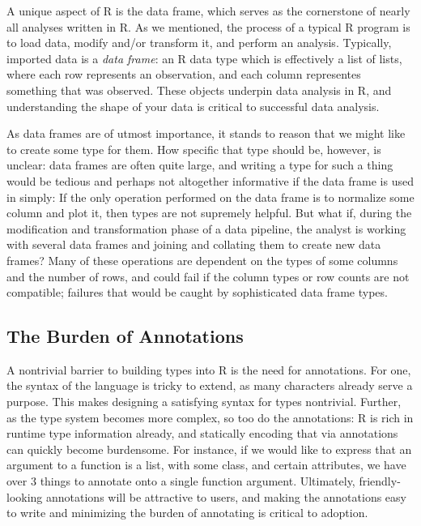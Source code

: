 \documentclass[sigplan,10pt,review,anonymous]{acmart}\settopmatter{printfolios=true,printccs=false,printacmref=false}
\begin{document}
A unique aspect of R is the data frame, which serves as the cornerstone of nearly all analyses written in R.
As we mentioned, the process of a typical R program is to load data, modify and/or transform it, and perform an analysis.
Typically, imported data is a {\it data frame}: an R data type which is effectively a list of lists, where each row represents an observation, and each column representes something that was observed. 
These objects underpin data analysis in R, and understanding the shape of your data is critical to successful data analysis.

As data frames are of utmost importance, it stands to reason that we might like to create some type for them.
How specific that type should be, however, is unclear: data frames are often quite large, and writing a type for such a thing would be tedious and perhaps not altogether informative if the data frame is used in simply:
If the only operation performed on the data frame is to normalize some column and plot it, then types are not supremely helpful.
But what if, during the modification and transformation phase of a data pipeline, the analyst is working with several data frames and joining and collating them to create new data frames?
Many of these operations are dependent on the types of some columns and the number of rows, and could fail if the column types or row counts are not compatible; failures that would be caught by sophisticated data frame types.

%
%
\subsection{The Burden of Annotations}

A nontrivial barrier to building types into R is the need for annotations.
For one, the syntax of the language is tricky to extend, as many characters already serve a purpose.
This makes designing a satisfying syntax for types nontrivial.
Further, as the type system becomes more complex, so too do the annotations:
R is rich in runtime type information already, and statically encoding that via annotations can quickly become burdensome.
For instance, if we would like to express that an argument to a function is a list, with some class, and certain attributes, we have over 3 things to annotate onto a single function argument.
Ultimately, friendly-looking annotations will be attractive to users, and making the annotations easy to write and minimizing the burden of annotating is critical to adoption.
\end{document}
